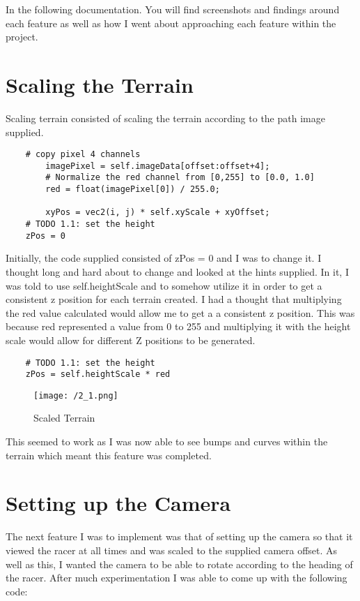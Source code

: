 \documentclass[11pt, oneside, a4paper]{article}
\begin{document}
In the following documentation. You will find screenshots and findings around each feature as well as how I went about approaching each feature within the project.

\section{Scaling the Terrain}
Scaling terrain consisted of scaling the terrain according to the path image supplied.
\begin{lstlisting}    
	# copy pixel 4 channels
        imagePixel = self.imageData[offset:offset+4];
        # Normalize the red channel from [0,255] to [0.0, 1.0]
        red = float(imagePixel[0]) / 255.0;

        xyPos = vec2(i, j) * self.xyScale + xyOffset;
	# TODO 1.1: set the height
	zPos = 0
\end{lstlisting}

Initially, the code supplied consisted of zPos = 0 and I was to change it. I thought long and hard about to change and looked at the hints supplied. In it, I was told to use self.heightScale and to somehow utilize it in order to get a consistent z position for each terrain created. I had a thought that multiplying the red value calculated would allow me to get a a consistent z position. This was because red represented a value from 0 to 255 and multiplying it with the height scale would allow for different Z positions to be generated.

\newpage
\begin{lstlisting}    
	# TODO 1.1: set the height
	zPos = self.heightScale * red
\end{lstlisting}

\begin{figure}[!ht]
	\centerline{\texttt{[image: /2\_1.png]}}
	\caption{Scaled Terrain}
	\label{fig:figure1}
\end{figure}

This seemed to work as I was now able to see bumps and curves within the terrain which meant this feature was completed.

\section{Setting up the Camera}
The next feature I was to implement was that of setting up the camera so that it viewed the racer at all times and was scaled to the supplied camera offset. As well as this, I wanted the camera to be able to rotate according to the heading of the racer. After much experimentation I was able to come up with the following code:
\end{document}
